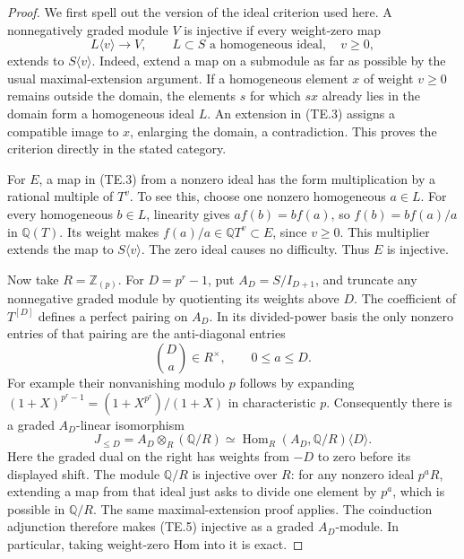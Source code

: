 \begin{proof}
We first spell out the version of the ideal criterion used here.
A nonnegatively graded module \(V\) is injective if every
weight-zero map
\[
                 L\langle v\rangle\longrightarrow V,
       \qquad L\subset S\text{ a homogeneous ideal},\quad v\geq0,
                                                        \tag{TE.3}
\]
extends to \(S\langle v\rangle\).  Indeed, extend a map on a
submodule as far as possible by the usual maximal-extension argument.
If a homogeneous element \(x\) of weight \(v\geq0\) remains outside
the domain, the elements \(s\) for which \(sx\) already lies in the
domain form a homogeneous ideal \(L\).  An extension in (TE.3)
assigns a compatible image to \(x\), enlarging the domain, a
contradiction.  This proves the criterion directly in the stated
category.

For \(E\), a map in (TE.3) from a nonzero ideal has the form
multiplication by a rational multiple of \(T^v\).  To see this,
choose one nonzero homogeneous \(a\in L\).  For every homogeneous
\(b\in L\), linearity gives \(a f(b)=b f(a)\), so
\(f(b)=b f(a)/a\) in \(\mathbb Q(T)\).  Its weight makes
\(f(a)/a\in\mathbb Q T^v\subset E\), since \(v\geq0\).
This multiplier extends the map to \(S\langle v\rangle\).
The zero ideal causes no difficulty.  Thus \(E\) is injective.

Now take \(R=\mathbb Z_{(p)}\).  For
\(D=p^r-1\), put \(A_D=S/I_{D+1}\), and truncate any
nonnegative graded module by quotienting its weights above \(D\).
The coefficient of \(T^{[D]}\) defines a perfect pairing on
\(A_D\).  In its divided-power basis the only nonzero entries
of that pairing are the anti-diagonal entries
\[
                         \binom Da\in R^\times,
                     \qquad 0\leq a\leq D.              \tag{TE.4}
\]
For example their nonvanishing modulo \(p\) follows by expanding
\((1+X)^{p^r-1}=(1+X^{p^r})/(1+X)\) in characteristic \(p\).
Consequently there is a graded \(A_D\)-linear isomorphism
\[
 J_{\leq D}=A_D\otimes_R(\mathbb Q/R)
   \simeq\operatorname{Hom}_R(A_D,\mathbb Q/R)\langle D\rangle.
                                                        \tag{TE.5}
\]
Here the graded dual on the right has weights from \(-D\) to zero
before its displayed shift.  The module \(\mathbb Q/R\) is injective
over \(R\): for any nonzero ideal \(p^aR\), extending a map from
that ideal just asks to divide one element by \(p^a\), which is
possible in \(\mathbb Q/R\).  The same maximal-extension proof
applies.  The coinduction adjunction therefore makes (TE.5)
injective as a graded \(A_D\)-module.  In particular, taking
weight-zero Hom into it is exact.


\end{proof}

